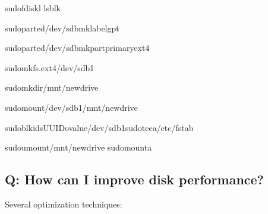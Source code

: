 \documentclass[letterpaper,10pt,english]{sphinxmanual}
\begin{document}
\begin{sphinxVerbatim}[commandchars=\\\{\}]
sudofdisk\PYGZhy{}l
lsblk

sudoparted/dev/sdbmklabelgpt

sudoparted/dev/sdbmkpartprimaryext4\PYGZpc{}\PYGZpc{}

sudomkfs.ext4/dev/sdb1

sudomkdir/mnt/newdrive

sudomount/dev/sdb1/mnt/newdrive

sudoblkid\PYGZhy{}sUUID\PYGZhy{}ovalue/dev/sdb1sudotee\PYGZhy{}a/etc/fstab

sudoumount/mnt/newdrive
sudomount\PYGZhy{}a
\end{sphinxVerbatim}


\subsection{Q: How can I improve disk performance?}
\label{\detokenize{faq:q-how-can-i-improve-disk-performance}}
\sphinxAtStartPar
{} Several optimization techniques:
\end{document}
